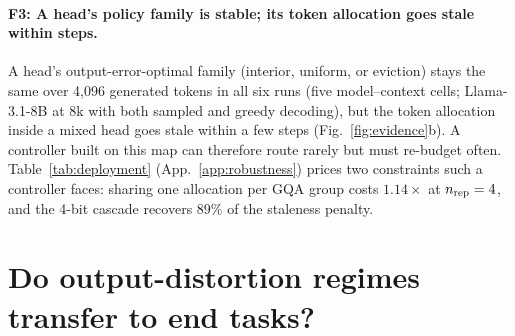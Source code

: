 \documentclass{article}
\theoremstyle{definition}
\begin{document}
\paragraph{F3: A head's policy family is stable; its token allocation goes stale within steps.}
A head's output-error-optimal family (interior, uniform, or eviction) stays the same over 4,096 generated tokens in all six runs (five model--context cells; Llama-3.1-8B at 8k with both sampled and greedy decoding), but the token allocation inside a mixed head goes stale within a few steps (Fig.~\ref{fig:evidence}b).  A controller built on this map can therefore route rarely but must re-budget often.  Table~\ref{tab:deployment} (App.~\ref{app:robustness}) prices two constraints such a controller faces: sharing one allocation per GQA group costs $1.14\times$ at $n_{\rm rep}=4$, and the 4-bit cascade recovers 89\% of the staleness penalty.



\section{Do output-distortion regimes transfer to end tasks?}
\label{sec:endtask}
\end{document}
